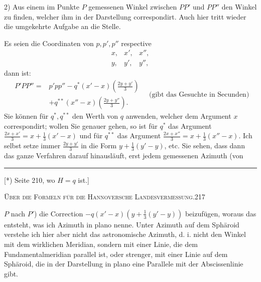2) Aus einem im Punkte \(P\) gemessenen Winkel zwischen \(PP'\) und \(PP''\) den Winkel zu finden, welcher ihm in der Darstellung correspondirt. Auch hier tritt wieder die umgekehrte Aufgabe an die Stelle.
\begin{center}
\end{center}
Es seien die Coordinaten von \(p,p',p''\) respective
\[
\begin{array}{ccc}x,&x',&x'',\\y,&y',&y'',\end{array}
\]
\noindent dann ist:
\[
\begin{aligned}
P'PP''={}&p'pp''-q^*(x'-x)\left(\frac{2y+y'}3\right)\\
&+q^{**}(x''-x)\left(\frac{2y+y''}3\right).
\end{aligned}
\quad\text{(gibt das Gesuchte in Secunden)}
\]
Sie können für \(q^*,q^{**}\) den Werth von \(q\) anwenden, welcher dem Argument \(x\) correspondirt; wollen Sie genauer gehen, so ist für \(q^*\) das Argument \(\frac{2x+x'}3=x+\frac13(x'-x)\) und für \(q^{**}\) das Argument \(\frac{2x+x''}3=x+\frac13(x''-x)\). Ich selbst setze immer \(\frac{2y+y'}3\) in die Form \(y+\frac13(y'-y)\), etc. Sie sehen, dass dann das ganze Verfahren darauf hinausläuft, erst jedem gemessenen Azimuth (von
\par\noindent\rule{4cm}{.4pt}\par
{\footnotesize\noindent\hspace*{\parindent}[*) Seite 210, wo \(H=q\) ist.]\par}

\par\clearpage
\noindent\mbox{}\hfill{\small\textsc{Über die Formeln für die Hannoversche Landesvermessung.}}\hfill217\par\medskip
\noindent \(P\) nach \(P'\)) die Correction \(-q(x'-x)(y+\frac13(y'-y))\) beizufügen, woraus das entsteht, was ich Azimuth in plano nenne. Unter Azimuth auf dem Sphäroid verstehe ich hier aber nicht das astronomische Azimuth, d. i. nicht den Winkel mit dem wirklichen Meridian, sondern mit einer Linie, die dem Fundamentalmeridian parallel ist, oder strenger, mit einer Linie auf dem Sphäroid, die in der Darstellung in plano eine Parallele mit der Abscissenlinie gibt.

